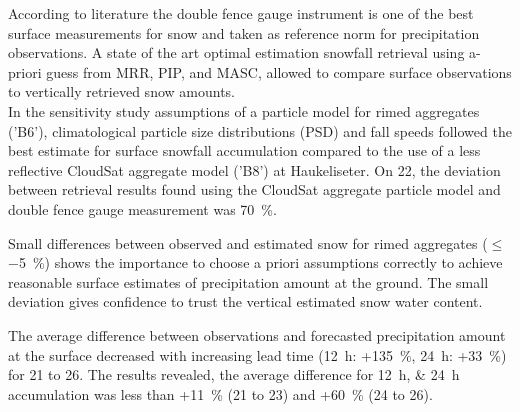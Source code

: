 According to literature the double fence gauge instrument is  one of the best surface measurements for snow and taken as reference norm for precipitation observations. 
A state of the art optimal estimation snowfall retrieval using a-priori guess from MRR, PIP, and MASC, allowed to compare surface observations to vertically retrieved snow amounts. 
\\
In the sensitivity study assumptions of a particle model for rimed aggregates ('B6'), climatological particle size distributions (PSD) and fall speeds followed the best estimate for surface snowfall accumulation compared to the use of a less reflective CloudSat aggregate model ('B8') 
at Haukeliseter. On \SI{22}{\dec}, the deviation between retrieval results found using the CloudSat aggregate particle model and double fence gauge measurement was \SI{70}{\percent}. 
\par\medskip
\noindent
Small differences between observed and estimated snow for rimed aggregates ($\le$ \SI{-5}{\percent}) shows the importance to choose a priori assumptions correctly to achieve reasonable surface estimates of precipitation amount at the ground. 
The small deviation gives confidence to trust the vertical estimated snow water content.
\par\medskip
\noindent
The average difference between observations and forecasted precipitation amount at the surface decreased with increasing lead time (\SI{12}{\hour}: +\SI{135}{\percent}, \SI{24}{\hour}: +\SI{33}{\percent}) for \num{21} to \SI{26}{\dec}.
The results revealed, the 
average difference for \SIlist{12;24}{\hour} accumulation   was less than +\SI{11}{\percent} (\num{21} to \SI{23}{\dec}) and +\SI{60}{\percent} (\num{24} to \SI{26}{\dec}). 
